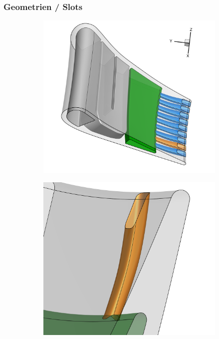 \documentclass[8pt, aspectratio=169]{beamer}
\begin{document}
\begin{frame}
	\frametitle{Geometrien / Slots}
	\vspace{0cm}\hspace{-0.5cm}
	\begin{figure}[H]
		\centering
		\begin{subfigure}{.45\textwidth}
			\includegraphics[width=\textwidth]{../../tec/slots/11.png}
		\end{subfigure}
		\phantom{aaa}
		\begin{subfigure}{.45\textwidth}
			\includegraphics[width=\textwidth]{../../tec/slots/12.png}
		\end{subfigure}
	\end{figure}
	\vfill
\end{frame}
\end{document}

